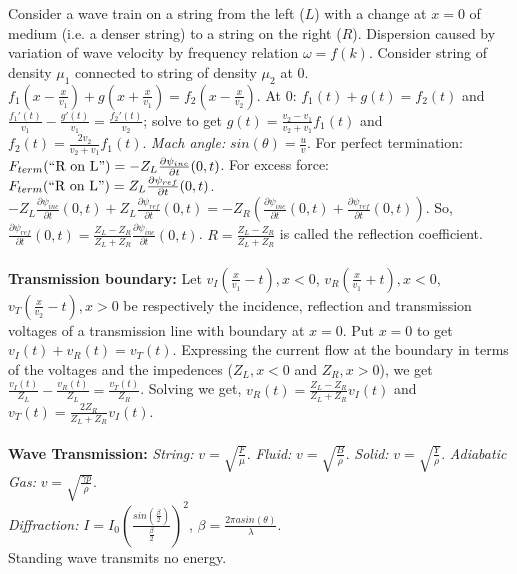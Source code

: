 Consider a wave train on a string from the left ($L$) with a change
at $x=0$ of medium (i.e. a denser string) to a string on the right ($R$).
Dispersion caused by variation of wave velocity by frequency
relation $\omega= f(k)$.  Consider string of density $\mu_1$ connected
to string of density $\mu_2$ at $0$.  $f_1(x-{\frac {x} {v_1}}) + g(x+{\frac {x} {v_1}})
= f_2 (x- {\frac {x} {v_2}})$.  At $0$: $f_1(t)+g(t)=f_2(t)$ and
${\frac {f_1'(t)} {v_1}}-{\frac {g'(t)} {v_1}} = {\frac {f_2'(t)} {v_2}}$;
solve to get $g(t)= {\frac {v_2 - v_1} {v_2+v_1}} f_1(t)$ and
$f_2(t)= {\frac {2v_2} {v_2+v_1}} f_1(t)$.  \emph{Mach angle:}
$sin( \theta)= {\frac u v}$.
For perfect termination:
$F_{\small {term}} (\textnormal{``R on L''})= -
Z_L {\frac {\partial \psi_{inc}} {\partial t}} (0,t)$.
For excess force:
$F_{\small{term}} (\textnormal{``R on L''})= Z_L 
{\frac {\partial \psi_{ref}} {\partial t}} (0,t)$.
$-Z_L {\frac {\partial \psi_{inc}} {\partial t}} (0,t)+
Z_L {\frac {\partial \psi_{ref}} {\partial t}} (0,t) =
-Z_R ({\frac {\partial \psi_{inc}} {\partial t}} (0,t)+
{\frac {\partial \psi_{ref}} {\partial t}} (0,t))$.  So,
${\frac {\partial \psi_{ref}} {\partial t}} (0,t)=
{\frac {Z_L - Z_R} {Z_L + Z_R}}
{\frac {\partial \psi_{inc}} {\partial t}} (0,t)$.
$R= {\frac {Z_L - Z_R} {Z_L + Z_R}}$ is called the reflection coefficient.
\\
\\
{\bf Transmission boundary:} Let 
$v_I({\frac {x}{v_1}}-t), x < 0$,
$v_R({\frac {x}{v_1}}+t), x < 0$,
$v_T({\frac {x}{v_2}}-t), x > 0$ be respectively the incidence,
reflection and transmission voltages of a transmission line with boundary
at $x=0$.  Put $x=0$ to get 
$v_I(t)+v_R(t)=v_T(t)$. Expressing the current
flow at the boundary in terms of the voltages and the impedences ($Z_L, x<0$ and
$Z_R, x>0$), we get
${\frac {v_I(t)} {Z_L}}-{\frac {v_R(t)} {Z_L}}={\frac {v_T(t)} {Z_R}}$.
Solving we get, $v_R(t)= {\frac {Z_L-Z_R}{Z_L+Z_R}}v_I(t)$ and
$v_T(t)= {\frac {2Z_R}{Z_L+Z_R}}v_I(t)$.
\\
\\
{\bf Wave Transmission:}
\emph{String:} $v= {\sqrt {\frac F \mu}}$.
\emph{Fluid:} $v= {\sqrt {\frac B \rho}}$.
\emph{Solid:} $v= {\sqrt {\frac Y \rho}}$.
\emph{Adiabatic Gas:} $v= {\sqrt {\frac {\gamma p } \rho}}$.\\
\emph{Diffraction:} $I = I_0 ({\frac {sin({\frac {\beta} {2}})} {\frac {\beta}{2}}})^2$,
$\beta = {\frac {2 \pi a sin( \theta )} {\lambda}}$.
\\
Standing wave transmits no energy.
\\
